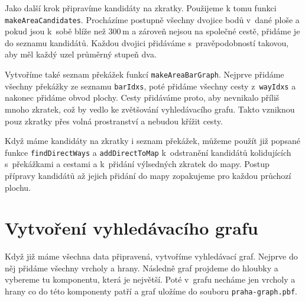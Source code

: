 Jako další krok připravíme kandidáty na zkratky. Použijeme k tomu funkci
\verb|makeAreaCandidates|. Procházíme postupně všechny dvojice bodů v~dané ploše
a pokud jsou k~sobě blíže než 300\,m a zároveň nejsou na společné cestě, přidáme
je do seznamu kandidátů. Každou dvojici přidáváme s~pravěpodobností takovou, aby
měl každý uzel průměrný stupeň dva.

Vytvoříme také seznam překážek funkcí \verb|makeAreaBarGraph|. Nejprve přidáme
všechny překážky ze seznamu \verb|barIdxs|, poté přidáme všechny cesty
z~\verb|wayIdxs| a nakonec přidáme obvod plochy. Cesty přidáváme proto, aby
nevnikalo příliš mnoho zkratek, což by vedlo ke zvětšování vyhledávacího grafu.
Takto vzniknou pouz zkratky přes volná prostranství a nebudou křížit cesty.

Když máme kandidáty na zkratky i seznam překážek, můžeme použít již popsané funkce
\verb|findDirectWays| a \verb|addDirectToMap| k~odstranění kandidátů
kolidujících
s~překážkami a cestami a k~přidání výlsedných zkratek do mapy. Postup přípravy
kandidátů až jejich přidání do mapy zopakujeme pro každou průchozí plochu.


\section{Vytvoření vyhledávacího grafu}
Když již máme všechna data připravená, vytvoříme vyhledávací graf. Nejprve do
něj přidáme všechny vrcholy a hrany. Následně graf projdeme do hloubky a
vybereme tu komponentu, která je největší. Poté v~grafu necháme jen vrcholy a
hrany co do této komponenty patří a graf uložíme do souboru
\verb|praha-graph.pbf|. 
